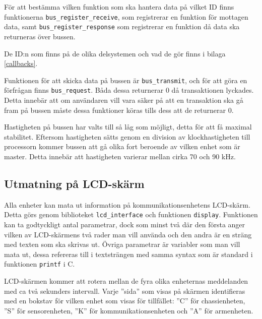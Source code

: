 För att bestämma vilken funktion som ska hantera data på vilket ID finns funktionerna \texttt{bus\_register\_receive}, som registrerar en funktion för mottagen data, samt \texttt{bus\_register\_response} som registrerar en funktion då data ska returneras över bussen.

De ID:n som finns på de olika delsystemen och vad de gör finns i bilaga \ref{callbacks}.

Funktionen för att skicka data på bussen är \verb|bus_transmit|, och för att göra en förfrågan finns \verb|bus_request|. Båda dessa returnerar 0 då transaktionen lyckades. Detta innebär att om användaren vill vara säker på att en transaktion ska gå fram på bussen måste dessa funktioner köras tills dess att de returnerar 0.

Hastigheten på bussen har valts till så låg som möjligt, detta för att få maximal stabilitet. Eftersom hastigheten sätts genom en division av klockhastigheten till processorn kommer bussen att gå olika fort beroende av vilken enhet som är master. Detta innebär att hastigheten varierar mellan cirka 70 och 90 kHz.

\subsection{Utmatning på LCD-skärm}
\label{sec:lcd_interface}

Alla enheter kan mata ut information på kommunikationsenhetens LCD-skärm. Detta görs genom biblioteket \verb|lcd_interface| och funktionen \verb|display|. Funktionen kan ta godtyckligt antal parametrar, dock som minst två där den första anger vilken av LCD-skärmens två rader man vill använda och den andra är en sträng med texten som ska skrivas ut. Övriga parametrar är variabler som man vill mata ut, dessa refereras till i textsträngen med samma syntax som är standard i funktionen \verb|printf| i C.

LCD-skärmen kommer att rotera mellan de fyra olika enheternas meddelanden med ca två sekunders intervall. Varje ''sida'' som visas på skärmen identifieras med en bokstav för vilken enhet som visas för tillfället: ''C'' för chassienheten, ''S'' för sensorenheten, ''K'' för kommunikationsenheten och ''A'' för armenheten.
